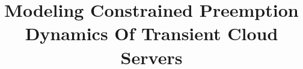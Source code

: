 \documentclass[sigconf]{acmart} %
\begin{document}
\title{Modeling Constrained Preemption Dynamics Of Transient Cloud Servers}
\author{}{}{}

\begin{abstract}
  
\end{abstract}

\maketitle






%





%

%










{


%
}
\end{document}
